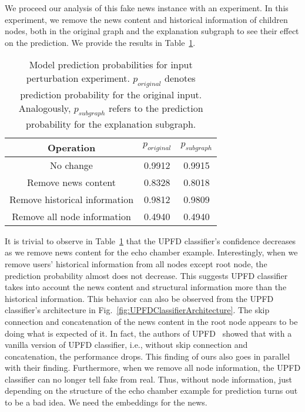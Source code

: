 We proceed our analysis of this fake news instance with an experiment. In this experiment, we remove the news content and historical information of children nodes, both in the original graph and the explanation subgraph to see their effect on the prediction. We provide the results in Table~\ref{tab:echoChamberFeatureRemovalExperimentResults}.\\
\begin{table}
    \centering
    \begin{tabular}{c | c | c}
        \textbf{Operation}            & $p_{original}$ & $p_{subgraph}$ \\
        \hline
        No change                     & 0.9912         & 0.9915         \\
        \hline
        Remove news content           & 0.8328         & 0.8018         \\
        \hline
        Remove historical information & 0.9812         & 0.9809         \\
        \hline
        Remove all node information   & 0.4940         & 0.4940         \\
    \end{tabular}
    \caption[Model prediction probabilities for input perturbation experiment.]{Model prediction probabilities for input perturbation experiment. $p_{original}$ denotes prediction probability for the original input. Analogously, $p_{subgraph}$ refers to the prediction probability for the explanation subgraph.}
    \label{tab:echoChamberFeatureRemovalExperimentResults}
\end{table}
It is trivial to observe in Table~\ref{tab:echoChamberFeatureRemovalExperimentResults} that the UPFD classifier's confidence decreases as we remove news content for the echo chamber example. Interestingly, when we remove users' historical information from all nodes except root node, the prediction probability almost does not decrease. This suggests UPFD classifier takes into account the news content and structural information more than the historical information. This behavior can also be observed from the UPFD classifier's architecture in Fig.~\ref{fig:UPFDClassifierArchitecture}. The skip connection and concatenation of the news content in the root node appears to be doing what is expected of it. In fact, the authors of UPFD~\parencite{UPFD_Dataset_Shu} showed that with a vanilla version of UPFD classifier, i.e., without skip connection and concatenation, the performance drops. This finding of ours also goes in parallel with their finding. Furthermore, when we remove all node information, the UPFD classifier can no longer tell fake from real. Thus, without node information, just depending on the structure of the echo chamber example for prediction turns out to be a bad idea. We need the embeddings for the news.\\
